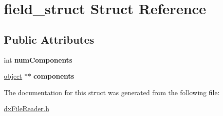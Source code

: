 \hypertarget{structfield__struct}{
\section{field\_\-struct Struct Reference}
\label{structfield__struct}
}
\subsection*{Public Attributes}
\begin{DoxyCompactItemize}
\item 
\hypertarget{structfield__struct_ae9760dfd5ca9e9bd6e8f78d79f13f243}{
int {\bfseries numComponents}}
\label{structfield__struct_ae9760dfd5ca9e9bd6e8f78d79f13f243}

\item 
\hypertarget{structfield__struct_a4e85debaf2b52c997eea81dc2ae5f128}{
\hyperlink{structobject__struct}{object} $\ast$$\ast$ {\bfseries components}}
\label{structfield__struct_a4e85debaf2b52c997eea81dc2ae5f128}

\end{DoxyCompactItemize}


The documentation for this struct was generated from the following file:\begin{DoxyCompactItemize}
\item 
\hyperlink{dxFileReader_8h}{dxFileReader.h}\end{DoxyCompactItemize}
